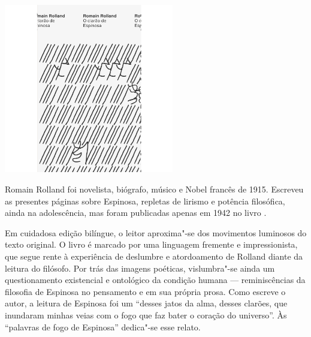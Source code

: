 \vfill

\hspace*{-.4cm}\begin{minipage}[c]{.5\linewidth}
\small{
{}}
\end{minipage}

\pagebreak


\begin{center}

\hspace*{.5cm}\includegraphics[width=74mm]{./grid/rolland.png}
\end{center}

\hspace*{-7cm}\hrulefill\hspace*{-7cm}

\medskip

\noindent{}Romain Rolland foi novelista, biógrafo, músico e Nobel francês de 1915. Escreveu as presentes páginas sobre Espinosa, repletas de lirismo e potência filosófica, ainda na adolescência, mas foram publicadas apenas em 1942 no livro {}. 

Em cuidadosa edição bilíngue, o leitor aproxima"-se dos movimentos luminosos do texto original. O livro é marcado por uma linguagem fremente e impressionista, que segue rente à experiência de deslumbre e atordoamento de Rolland diante da leitura do filósofo. Por trás das imagens poéticas, vislumbra"-se ainda um questionamento existencial e ontológico da condição humana --- reminiscências da filosofia de Espinosa no pensamento e em sua própria prosa. Como escreve o autor, a leitura de Espinosa foi um “desses jatos da alma, desses clarões, que inundaram minhas veias com o fogo que faz bater o coração do universo”. Às “palavras de fogo de Espinosa” dedica"-se esse relato.

